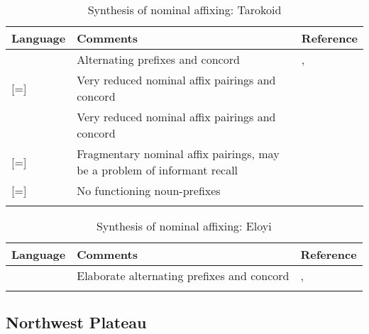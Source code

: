 \documentclass[output=paper]{langsci/langscibook}
\begin{document}
\begin{table}
\caption{Synthesis of nominal affixing: Tarokoid}
\small
\begin{tabularx}{\textwidth}{lQp{2.8cm}}
\lsptoprule
 Language 	& Comments 	&   Reference\\
\midrule
{} 	& Alternating prefixes and concord 	& {\raggedright \citet{Sibomana1981},\newline \citet{Longtau2008}}\\
\tablevspace
{} [=] 	& Very reduced nominal affix pairings and concord 	& \\
\tablevspace
{} 	& Very reduced nominal affix pairings and concord 	& \\
\tablevspace
{} [=] 	& Fragmentary nominal affix pairings, may be a problem of informant recall 	&  \\
\tablevspace
{} [=] 	& No functioning noun-prefixes 	& \\
\lspbottomrule
\end{tabularx} 
\end{table}

\begin{table}
\caption{Synthesis of nominal affixing: Eloyi}
\label{tab:nomaffplat:1z}
\small
\begin{tabularx}{\textwidth}{lQp{2.8cm}}
\lsptoprule
 Language 	& Comments 	&   Reference\\
\midrule
{} 	& Elaborate alternating prefixes and concord 	& \citet{Armstrong1964},\newline \citet{Mackay1964}\\
\lspbottomrule
\end{tabularx}
\end{table}

\newpage  
  
\subsection{Northwest Plateau} %
\end{document}
